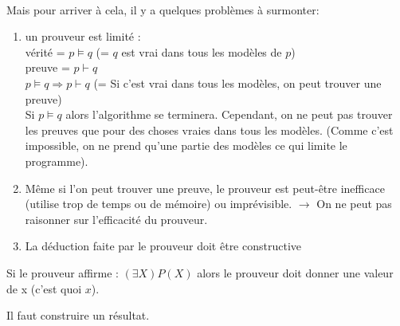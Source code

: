 \paragraph{}
Mais pour arriver à cela, il y a quelques problèmes à surmonter:
\begin{enumerate}\renewcommand {\theenumi }{\alph {enumi}}
	\item un prouveur est limité :\\
		vérité = $ p \models q $ (= $ q $ est vrai dans tous les modèles de $ p $)\\
		preuve = $ p  \vdash q $ \\
		$ p \models q \Rightarrow p \vdash q $ (= Si c’est vrai dans tous les modèles, on peut trouver une preuve)\\
		Si $ p \models q $ alors l’algorithme se terminera. Cependant, on ne peut pas trouver les preuves que pour des choses vraies dans tous les modèles. (Comme c’est impossible, on ne prend qu’une partie des modèles ce qui limite le programme).
		
		\item Même si l'on peut trouver une preuve, le prouveur est peut-être inefficace (utilise trop de temps ou de mémoire) ou imprévisible. $ \to $ On ne peut pas raisonner sur l’efficacité du prouveur.
		
		\item La déduction faite par le prouveur doit être constructive  
\end{enumerate}

		Si le prouveur affirme : $ (\exists X) P(X) $  alors le prouveur doit donner une valeur de x (c’est quoi $ x $).



Il faut construire un résultat.

